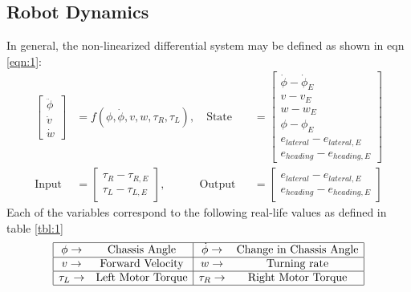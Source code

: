 \documentclass[12pt]{article}
\begin{document}
\subsection{Robot Dynamics} \label{sec:2.1}
In general, the non-linearized differential system may be defined as shown in eqn \ref{eqn:1}:
\begin{equation} \label{eqn:1}
    \begin{aligned}
    \begin{bmatrix}
        \ddot{\phi} \\ \dot{v} \\ \dot{w}
    \end{bmatrix} &= f(\phi, \dot{\phi}, v, w, \tau_R, \tau_L), \quad
    \mbox{State} &&= 
    \begin{bmatrix}
        \dot{\phi} - \dot{\phi}_E \\ v - v_E \\ w-w_E \\ \phi - \phi_E \\ e_{lateral} - e_{lateral,E} \\ e_{heading} - e_{heading, E}
    \end{bmatrix} \\
    \mbox{Input} &=
    \begin{bmatrix}
        \tau_R - \tau_{R,E} \\ \tau_L - \tau_{L,E}
    \end{bmatrix}, \qquad \enspace \enspace
    \mbox{Output} &&= 
    \begin{bmatrix}
        e_{lateral} - e_{lateral,E} \\ e_{heading} - e_{heading, E}
    \end{bmatrix}
    \end{aligned}
\end{equation}
Each of the variables correspond to the following real-life values as defined in table \ref{tbl:1}
\begin{equation} \label{tbl:1}
\begin{array}{|c c| c c|}
    \hline
    \phi \rightarrow & \mbox{Chassis Angle} & \dot{\phi} \rightarrow & \mbox{Change in Chassis Angle} \\ \hline
    v \rightarrow & \mbox{Forward Velocity} & w \rightarrow & \mbox{Turning rate}\\ \hline
    \tau_L \rightarrow & \mbox{Left Motor Torque} & \tau_R \rightarrow & \mbox{Right Motor Torque}\\ \hline
\end{array}
\end{equation}
\end{document}

